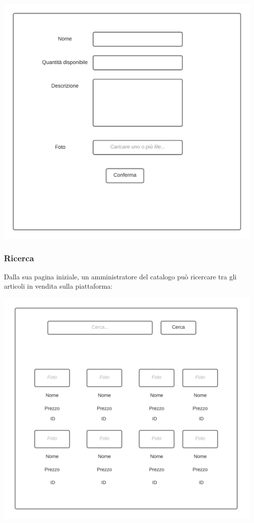 \documentclass[12pt]{article}
\begin{document}
\begin{center}
\includegraphics[height=0.3\textheight]{Mockup/AmministratoreCatalogo/NuovoArticolo}
\end{center}

\newpage

\subsubsection{Ricerca}
Dalla sua pagina iniziale, un amministratore del catalogo può ricercare tra gli articoli in vendita sulla piattaforma:

\begin{center}
\includegraphics[height=0.3\textheight]{Mockup/AmministratoreCatalogo/Ricerca}
\end{center}
\end{document}
